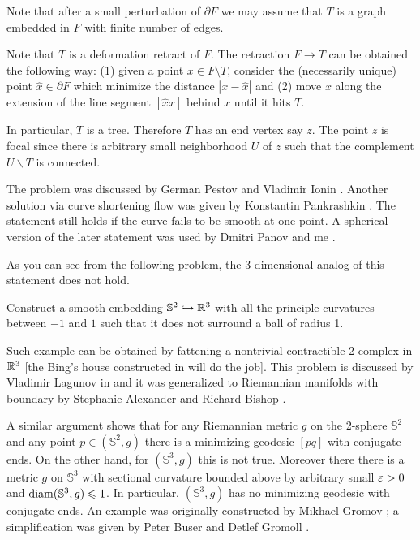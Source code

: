 \medskip

Note that after a small perturbation
of $\partial F$ we may assume that
$T$ is a graph embedded in
$F$ with finite number of edges.

Note that $T$ is a
deformation retract of $F$.
The retraction $F\to T$ can be obtained the following way:
(1) given a point $x\in F\setminus T$,
consider  the (necessarily unique) point $\hat x\in \partial F$ which minimize the distance $|x-\hat x|$ and
(2) move $x$ along the extension of the line segment $[\hat x x]$ behind $x$ until it hits $T$.

In particular, $T$ is a tree.
Therefore $T$  has
an end vertex say $z$.
The point $z$ is focal since there is arbitrary small neighborhood $U$ of $z$ such that the complement $U\backslash T$ is connected.
\qeds

The problem was discussed by German Pestov and Vladimir Ionin \cite[see][]{pestov-ionin}.
Another solution via curve shortening flow 
was given by Konstantin Pankrashkin \cite[see][]{pankrashkin}.
The statement still holds if the curve fails to be smooth at one point.
A spherical version of the later statement 
was used by Dmitri Panov and me \cite[see][]{panov-petrunin-ramification}.

As you can see from the following problem, the 3-dimensional analog of this statement does not hold.

\begin{pr}
Construct a smooth embedding $\mathbb{S}^2\hookrightarrow \mathbb{R}^3$ 
with all the principle curvatures between $-1$ and $1$
such that it does not surround a ball of radius 1.
\end{pr}

Such example can be obtained by fattening a nontrivial contractible 2-complex in $\mathbb{R}^3$ 
[the Bing's house constructed in will do the job].
This problem is discussed by Vladimir Lagunov in \cite{lagunov-2} 
and it was generalized to Riemannian manifolds with boundary by Stephanie Alexander and Richard Bishop \cite[see][]{alexander-bishop}.

A similar argument shows that for any Riemannian metric $g$ on the 2-sphere $\mathbb S^2$ 
and any point $p\in(\mathbb S^2,g)$ there is a minimizing geodesic $[pq]$ with conjugate ends.
On the other hand, for $(\mathbb S^3,g)$ this is not true.
Moreover there there is a metric $g$ on $\mathbb{S}^3$ 
with sectional curvature bounded above by arbitrary small $\varepsilon>0$ and $\operatorname{\rm diam}\nolimits(\mathbb{S}^3,g)\leqslant 1$.
In particular, $(\mathbb S^3,g)$ has no minimizing geodesic with conjugate ends.
An example was originally constructed by Mikhael Gromov \cite[see][]{gromov-almost-flat}; 
a simplification was given by 
Peter Buser
and Detlef Gromoll \cite[see][]{buser-gromoll}.

